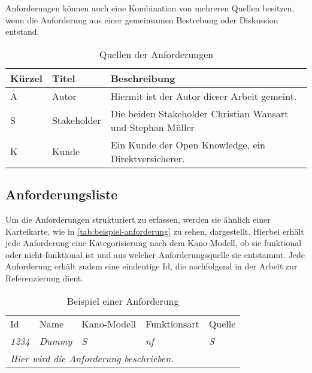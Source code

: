 Anforderungen können auch eine Kombination von mehreren Quellen besitzen, wenn die Anforderung aus einer gemeinsamen Bestrebung oder Diskussion entstand.

\begin{table}[H]
\begin{tabular}{ |p{1.15cm}|p{1.9cm}|p{10.45cm}| }
	\hline
	Kürzel & Titel & Beschreibung \\
	\hline
	A & Autor & Hiermit ist der Autor dieser Arbeit gemeint. \\
	\hline
	S & Stakeholder & Die beiden Stakeholder Christian Wansart und Stephan Müller \\
	\hline
	K & Kunde & Ein Kunde der Open Knowledge, ein Direktversicherer. \\
	\hline
\end{tabular}
 \captionsetup{justification=centering}
  \caption{Quellen der Anforderungen}
   \label{tab:quellen-der-anforderungen}
\end{table}
	
\subsection{Anforderungsliste}

Um die Anforderungen strukturiert zu erfassen, werden sie ähnlich einer Karteikarte, wie in \autoref{tab:beispiel-anforderung} zu sehen, dargestellt. Hierbei erhält jede Anforderung eine Kategorisierung nach dem Kano-Modell, ob sie funktional oder nicht-funktional ist und aus welcher Anforderungsquelle sie entstammt. Jede Anforderung erhält zudem eine eindeutige Id, die nachfolgend in der Arbeit zur Referenzierung dient.

\begin{table}[H]
\begin{tabular}{ |p{1.25cm}|p{5.5cm}|p{2.25cm}|p{2.1cm}|p{1.25cm}| }
\hline
Id            & Name          & Kano-Modell   & Funktionsart  & Quelle        \\
\textit{1234} & \textit{Dummy} & \textit{S} & \textit{nf} & \textit{S} \\
\hline
\multicolumn{5}{|l|}{\textit{Hier wird die Anforderung beschrieben.}} \\
\hline
\end{tabular}
 \captionsetup{justification=centering}
  \caption{Beispiel einer Anforderung}
   \label{tab:beispiel-anforderung}
\end{table}



